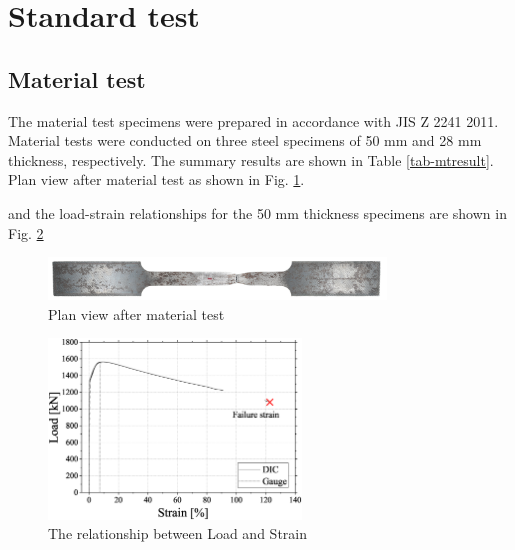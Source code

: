 \section{Standard test}

\subsection{Material test}

The material test specimens were prepared in accordance with JIS Z 2241 2011\cite{JIStest}. Material tests were conducted on three steel specimens of 50 mm and 28 mm thickness, respectively. The summary results are shown in Table \ref{tab-mtresult}. Plan view after material test as shown in Fig. \ref{fig-mt-1}. \par

and the load-strain relationships for the 50 mm thickness specimens are shown in Fig. \ref{fig-mt50-ls}

\begin{figure}[htbp]
    \centering
    \includegraphics[width=0.8\textwidth]{imgs/ch6/mt-1.jpg}
    \caption{Plan view after material test}
    \label{fig-mt-1}
\end{figure}

\begin{figure}[htbp]
    \centering
    \includegraphics[width=0.6\textwidth]{imgs/ch6/mt50-LS.eps}
    \caption{The relationship between Load and Strain}
    \label{fig-mt50-ls}
\end{figure}

